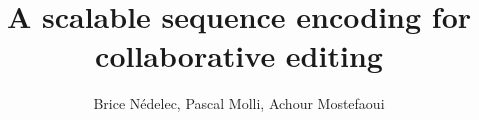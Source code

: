 \documentclass[times]{cpeauth}
\begin{document}
\title{A scalable sequence encoding for collaborative editing}

\author{Brice N{\'e}delec\corrauth, Pascal Molli\corrauth, Achour Mostefaoui\corrauth}

\address{\centering%
  LINA, 2 rue de la Houssini{\`e}re,\\
  BP92208, 44322 Nantes Cedex 03, France\\
  \url{first.last@univ-nantes.fr}
}






\maketitle














\end{document}
